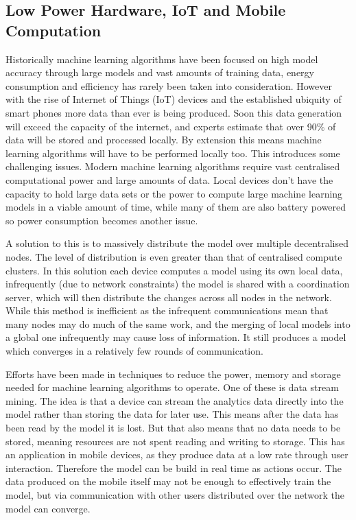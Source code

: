 \subsection{Low Power Hardware, IoT and Mobile Computation}

Historically machine learning algorithms have been focused on high model
accuracy through large models and vast amounts of training data, energy
consumption and efficiency has rarely been taken into consideration. However
with the rise of Internet of Things (IoT) devices and the established ubiquity
of smart phones more data than ever is being produced. Soon this data generation
will exceed the capacity of the internet, and experts estimate that over 90\% of
data will be stored and processed locally. \cite{Chaing2016FogIoT} By extension
this means machine learning algorithms will have to be performed locally too.
This introduces some challenging issues. Modern machine learning algorithms
require vast centralised computational power and large amounts of data. Local
devices don't have the capacity to hold large data sets or the power to compute
large machine learning models in a viable amount of time, while many of them are
also battery powered so power consumption becomes another issue.

A solution to this is to massively distribute the model over multiple
decentralised nodes. The level of distribution is even greater than that of
centralised compute clusters. In this solution each device computes a model
using its own local data, infrequently (due to network constraints) the model is
shared with a coordination server, which will then distribute the changes across
all nodes in the network. \cite{wang2018EdgeLearning} While this method is
inefficient as the infrequent communications mean that many nodes may do much of
the same work, and the merging of local models into a global one infrequently
may cause loss of information. It still produces a model which converges in a
relatively few rounds of communication. \cite{konevcny2016federated}

Efforts have been made in techniques to reduce the power, memory and storage
needed for machine learning algorithms to operate. One of these is data stream
mining. The idea is that a device can stream the analytics data directly into
the model rather than storing the data for later use.
\cite{garciaMartin2019MLEnergy} This means after the data has been read by the
model it is lost. But that also means that no data needs to be stored, meaning
resources are not spent reading and writing to storage. This has an application
in mobile devices, as they produce data at a low rate through user interaction.
Therefore the model can be build in real time as actions occur. The data
produced on the mobile itself may not be enough to effectively train the model,
but via communication with other users distributed over the network the model
can converge. \cite{konevcny2016federated}

